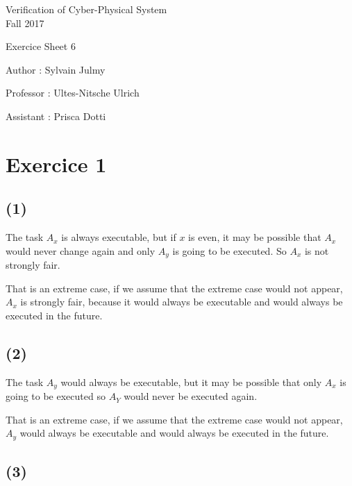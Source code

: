 \documentclass[a4paper,11pt]{report}
\author{Sylvain Julmy}
\date{\today}
\begin{document}
\begin{center}
\Large{
    Verification of Cyber-Physical System\\
    Fall 2017
  }
  
  \noindent\makebox[\linewidth]{\rule{\linewidth}{0.4pt}}
  Exercice Sheet 6

  \vspace*{1.4cm}

  Author : Sylvain Julmy
  \noindent\makebox[\linewidth]{\rule{\linewidth}{0.4pt}}

  \begin{flushleft}
    Professor : Ultes-Nitsche Ulrich
    
    Assistant : Prisca Dotti
  \end{flushleft}

  \noindent\makebox[\linewidth]{\rule{\textwidth}{1pt}}
\end{center}

\section*{Exercice 1}

\subsection*{(1)}

The task $A_x$ is always executable, but if $x$ is even, it may be possible that
$A_x$ would never change again and only $A_y$ is going to be executed. So $A_x$
is not strongly fair.

That is an extreme case, if we assume that the extreme case would not appear,
$A_x$ is strongly fair, because it would always be executable and would always
be executed in the future.

\subsection*{(2)}

The task $A_y$ would always be executable, but it may be possible that only
$A_x$ is going to be executed so $A_Y$ would never be executed again.

That is an extreme case, if we assume that the extreme case would not appear,
$A_y$ would always be executable and would always be executed in the future.

\subsection*{(3)}
\end{document}
